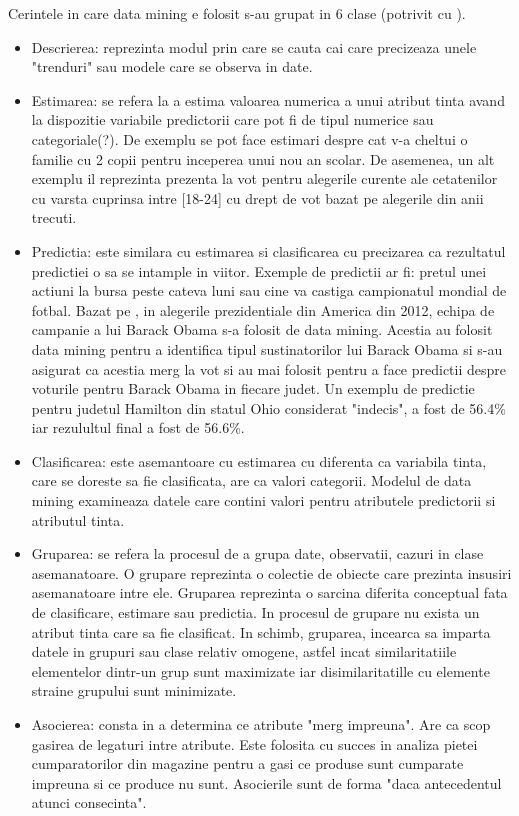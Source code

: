 Cerintele in care data mining e folosit s-au grupat in 6 clase (potrivit cu \parencite{Disco}).
\begin{itemize}
\item Descrierea: reprezinta modul prin care se cauta cai care precizeaza unele "trenduri" sau modele care se observa in date.
\item Estimarea: se refera la a estima valoarea numerica a unui atribut tinta avand la dispozitie variabile predictorii care pot fi de tipul numerice sau categoriale(?). De exemplu se pot face estimari despre cat v-a cheltui o familie cu 2 copii pentru inceperea unui nou an scolar. De asemenea, un alt exemplu il reprezinta prezenta la vot pentru alegerile curente ale cetatenilor cu varsta cuprinsa intre [18-24] cu drept de vot bazat pe alegerile din anii trecuti.
\item Predictia: este similara cu estimarea si clasificarea cu precizarea ca rezultatul predictiei o sa se intample in viitor. Exemple de predictii ar fi: pretul unei actiuni la bursa peste cateva luni sau cine va castiga campionatul mondial de fotbal. Bazat pe \parencite{Disco}, in alegerile prezidentiale din America din 2012, echipa de campanie a lui Barack Obama s-a folosit de data mining. Acestia au folosit data mining pentru a identifica tipul sustinatorilor lui Barack Obama si s-au asigurat ca acestia merg la vot si au mai folosit pentru a face predictii despre voturile pentru Barack Obama in fiecare judet. Un exemplu de predictie pentru judetul Hamilton din statul Ohio considerat "indecis", a fost de 56.4\% iar rezulultul final a fost de 56.6\%.
\item Clasificarea: este asemantoare cu estimarea cu diferenta ca variabila tinta, care se doreste sa fie clasificata, are ca valori categorii. Modelul de data mining examineaza datele care contini valori pentru atributele predictorii si atributul tinta.
\item Gruparea: se refera la procesul de a grupa date, observatii, cazuri in clase asemanatoare. O grupare reprezinta o colectie de obiecte care prezinta insusiri asemanatoare intre ele. Gruparea reprezinta o sarcina diferita conceptual fata de clasificare, estimare sau predictia. In procesul de grupare nu exista un atribut tinta care sa fie clasificat. In schimb, gruparea, incearca sa imparta datele in grupuri sau clase relativ omogene, astfel incat similaritatiile elementelor dintr-un grup sunt maximizate iar disimilaritatille cu elemente straine grupului sunt minimizate.
\item Asocierea: consta in a determina ce atribute "merg impreuna". Are ca scop gasirea de legaturi intre atribute. Este folosita cu succes in analiza pietei cumparatorilor din magazine pentru a gasi ce produse sunt cumparate impreuna si ce produce nu sunt. Asocierile sunt de forma "daca antecedentul atunci consecinta".
\end{itemize}
